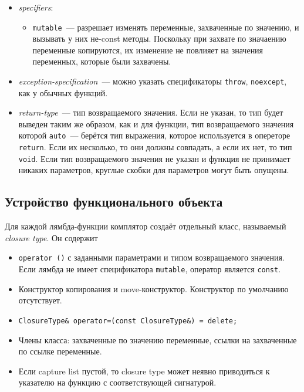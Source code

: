\begin{itemize}
    \item \emph{specifiers}:
    \begin{itemize}
        \item \texttt{mutable}~--- разрешает изменять переменные, захваченные по значению, и вызывать у них
        не-const методы. Поскольку при захвате по значаению переменные копируются, их изменение не повлияет на значения
        переменных, которые были захвачены.
    \end{itemize}
    \item \emph{exception-specification}~--- можно указать спецификаторы \texttt{throw}, \texttt{noexcept},
    как у обычных функций.
    \item \emph{return-type}~--- тип возвращаемого значения. Если не указан, то тип будет выведен таким же образом,
    как и для функции, тип возвращаемого значения которой \texttt{auto}~--- берётся тип выражения,
    которое используется в опереторе \texttt{return}. Если их несколько, то они должны совпадать, а если их нет,
    то тип \texttt{void}.
    Если тип возвращаемого значения не указан и функция не принимает никаких параметров, круглые скобки для параметров могут быть опущены.
\end{itemize}

\subsection{Устройство функционального объекта}
Для каждой лямбда-функции комплятор создаёт отдельный класс, называемый \emph{closure type}. Он содержит

\begin{itemize}
    \item \texttt{operator ()} с заданными параметрами и типом возвращаемого значения.
    Если лямбда не имеет спецификатора \texttt{mutable}, оператор является \texttt{const}.
    \item Конструктор копирования и move-конструктор. Конструктор по умолчанию отсутствует.
    \item \texttt{ClosureType& operator=(const ClosureType&) = delete;}
    \item Члены класса: захваченные по значению переменные, ссылки на захваченные по ссылке переменные.
    \item Если capture list пустой, то closure type может неявно приводиться к указателю на функцию с соответствующей сигнатурой.
\end{itemize}


